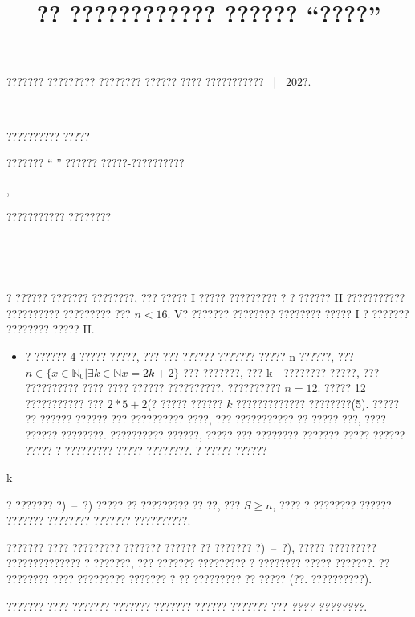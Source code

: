 \documentclass[12pt, a4paper]{article}
\title{?? ???????????? ?????? \textnumero 3 ``????''}%
\makeatletter
\renewcommand\maketitle{\bf
\small\centerline{??????? ????????? ???????? ?????? ???? ??????????? \ | \ 202?.}\ \\ %
\Large\centerline{\scshape ?????????? ?????}
\normalsize\centerline{??????? ``\@team'' ?????? ?????-??????????}
\centerline{\@title,}
\centerline{??????????? ????????}
\centerline{\@otherteam}\normalsize
\ \vspace{0.4cm}
}
\def\@team{ }
\def\@otherteam{}
\makeatother
\begin{document}
\maketitle

\\
\normalfont

? ?????? ??????? ????????, ??? ????? I ????? ????????? ? ? ?????? II ??????????? ?????????? ????????? ??? $n < 16$. V? ??????? ???????? ???????? ????? I ? ??????? ???????? ????? II.

\vspace{12pt}

\begin{itemize}
	\item ? ?????? 4 ????? ?????, ??? ??? ?????? ??????? ????? n ??????, ??? $n \in \{x \in \mathbb{N}_{0} | \exists k \in \mathbb{N} x = 2k+2\}$ ??? ???????, ??? k - ???????? ?????, ??? ?????????? ???? ???? ?????? ??????????. ?????????? $n = 12$. ????? 12 ??????????? ??? $2*5+2$(? ????? ?????? $k$ ????????????? ????????(5). ????? ?? ?????? ?????? ??? ?????????? ????, ??? ??????????? ?? ????? ???, ???? ?????? ????????. ?????????? ??????, ????? ??? ???????? ??????? ????? ?????? ????? ? ????????? ????? ????????. ? ????? ?????? 
\end{itemize}k
\vspace{12pt}

? ??????? ?)~--~?) ????? ?? ????????? ?? ??, ??? $S\geqslant n$, ???? ? ???????? ?????? ??????? ???????? ??????? ??????????.

\vspace{12pt}

??????? ???? ????????? ??????? ?????? ?? ??????? ?)~--~?), ????? ????????? ?????????????? ? ???????, ??? ??????? ????????? ? ???????? ????? ???????. ?? ???????? ???? ????????? ??????? ? ?? ????????? ?? ????? (??. ??????????).

??????? ???? ??????? ??????? ??????? ?????? ??????? ???
\textit{???? ????????}.

\vspace{12pt}
\end{document}
